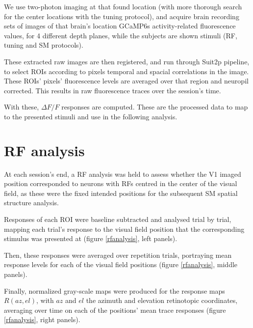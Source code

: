 We use two-photon imaging at that found location (with more thorough search for the center locations with the tuning protocol), and acquire brain recording sets of images of that brain's location GCaMP6s activity-related fluorescence values, for 4 different depth planes, while the subjects are shown stimuli (RF, tuning and SM protocols). 

These extracted raw images are then registered, and run through Suit2p pipeline, to select ROIs according to pixels temporal and spacial correlations in the image. These ROIs' pixels' fluorescence levels are averaged over that region and neuropil corrected. This results in raw fluorescence traces over the session's time.

With these, $\Delta F/F$ responses are computed. These are the processed data to map to the presented stimuli and use in the following analysis.

\section{RF analysis}

At each session's end, a RF analysis was held to assess whether the V1 imaged position corresponded to neurons with RFs centred in the center of the visual field, as these were the fixed intended positions for the subsequent SM spatial structure analysis.

Responses of each ROI were baseline subtracted and analysed trial by trial, mapping each trial's response to the visual field position that the corresponding stimulus was presented at (figure \ref{rfanalysis}, left panels).

Then, these responses were averaged over repetition trials, portraying mean response levels for each of the visual field positions (figure \ref{rfanalysis}, middle panels).

Finally, normalized gray-scale maps were produced for the response maps $R(az, el)$, with $az$ and $el$ the azimuth and elevation retinotopic coordinates, averaging over time on each of the positions' mean trace responses (figure \ref{rfanalysis}, right panels).

